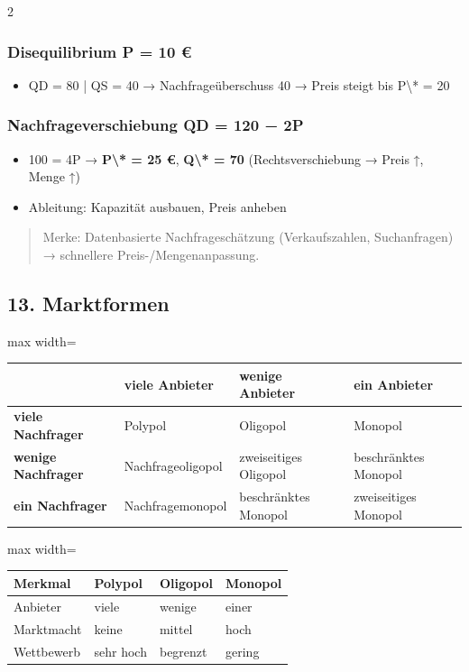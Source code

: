 \documentclass[10pt, a4paper]{article}
\begin{document}
\begin{multicols}{2}
\subsubsection{Disequilibrium P = 10 €}
\begin{itemize}
  \item QD = 80 | QS = 40 → Nachfrageüberschuss 40 → Preis steigt bis P\textbackslash{}* = 20
\end{itemize}


\subsubsection{Nachfrageverschiebung QD = 120 − 2P}
\begin{itemize}
  \item 100 = 4P → \textbf{P\textbackslash{}* = 25 €}, \textbf{Q\textbackslash{}* = 70} (Rechtsverschiebung → Preis ↑, Menge ↑)
  \item Ableitung: Kapazität ausbauen, Preis anheben
\end{itemize}

\begin{quote}
Merke: Datenbasierte Nachfrageschätzung (Verkaufszahlen, Suchanfragen) → schnellere Preis-/Mengenanpassung.
\end{quote}


\subsection{13. Marktformen}


{\small
\begin{adjustbox}{max width=\linewidth}
{\scriptsize
\begin{tabular}{llll}
\toprule
\textbf{} & \textbf{viele Anbieter} & \textbf{wenige Anbieter} & \textbf{ein Anbieter} \\
\midrule
\textbf{viele Nachfrager} & Polypol & Oligopol & Monopol \\
\textbf{wenige Nachfrager} & Nachfrageoligopol & zweiseitiges Oligopol & beschränktes Monopol \\
\textbf{ein Nachfrager} & Nachfragemonopol & beschränktes Monopol & zweiseitiges Monopol \\
\bottomrule
\end{tabular}
}
\end{adjustbox}
}



{\small
\begin{adjustbox}{max width=\linewidth}
{\scriptsize
\begin{tabular}{llll}
\toprule
\textbf{Merkmal} & \textbf{Polypol} & \textbf{Oligopol} & \textbf{Monopol} \\
\midrule
Anbieter & viele & wenige & einer \\
Marktmacht & keine & mittel & hoch \\
Wettbewerb & sehr hoch & begrenzt & gering \\
\bottomrule
\end{tabular}
}
\end{adjustbox}
}




\end{multicols}
\end{document}
